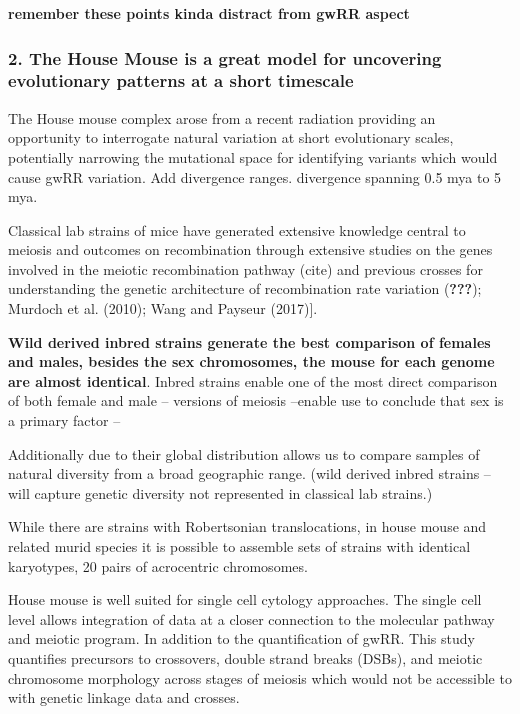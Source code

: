 \documentclass[
]{article}
\begin{document}
\textbf{remember these points kinda distract from gwRR aspect}

\hypertarget{the-house-mouse-is-a-great-model-for-uncovering-evolutionary-patterns-at-a-short-timescale}{%
\subsubsection{2. The House Mouse is a great model for uncovering
evolutionary patterns at a short
timescale}\label{the-house-mouse-is-a-great-model-for-uncovering-evolutionary-patterns-at-a-short-timescale}}

The House mouse complex arose from a recent radiation providing an
opportunity to interrogate natural variation at short evolutionary
scales, potentially narrowing the mutational space for identifying
variants which would cause gwRR variation. Add divergence ranges.
divergence spanning 0.5 mya to 5 mya.

Classical lab strains of mice have generated extensive knowledge central
to meiosis and outcomes on recombination through extensive studies on
the genes involved in the meiotic recombination pathway (cite) and
previous crosses for understanding the genetic architecture of
recombination rate variation ({\textbf{???}}); Murdoch et al. (2010);
Wang and Payseur (2017){]}.

\textbf{Wild derived inbred strains generate the best comparison of
females and males, besides the sex chromosomes, the mouse for each
genome are almost identical}. Inbred strains enable one of the most
direct comparison of both female and male -- versions of meiosis
--enable use to conclude that sex is a primary factor --

Additionally due to their global distribution allows us to compare
samples of natural diversity from a broad geographic range. (wild
derived inbred strains -- will capture genetic diversity not represented
in classical lab strains.)

While there are strains with Robertsonian translocations, in house mouse
and related murid species it is possible to assemble sets of strains
with identical karyotypes, 20 pairs of acrocentric chromosomes.

House mouse is well suited for single cell cytology approaches. The
single cell level allows integration of data at a closer connection to
the molecular pathway and meiotic program. In addition to the
quantification of gwRR. This study quantifies precursors to crossovers,
double strand breaks (DSBs), and meiotic chromosome morphology across
stages of meiosis which would not be accessible to with genetic linkage
data and crosses.
\end{document}

